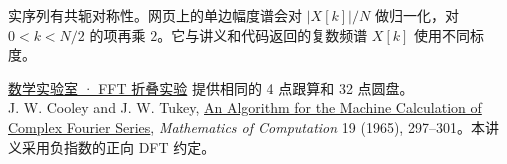 \documentclass[UTF8,11pt,a4paper,fontset=fandol]{ctexart}
\begin{document}
实序列有共轭对称性。网页上的单边幅度谱会对 $|X[k]|/N$ 做归一化，对 $0<k<N/2$ 的项再乘 $2$。它与讲义和代码返回的复数频谱 $X[k]$ 使用不同标度。

{\small\color{handoutmuted}
\href{http://yeyaozhi.eu.cc/learning/math-lab/fft/}{数学实验室 · FFT 折叠实验} 提供相同的 4 点跟算和 32 点圆盘。\\
J. W. Cooley and J. W. Tukey,
\href{https://doi.org/10.1090/S0025-5718-1965-0178586-1}{An Algorithm for the Machine Calculation of Complex Fourier Series},
\emph{Mathematics of Computation} 19 (1965), 297--301。本讲义采用负指数的正向 DFT 约定。}
\end{document}
